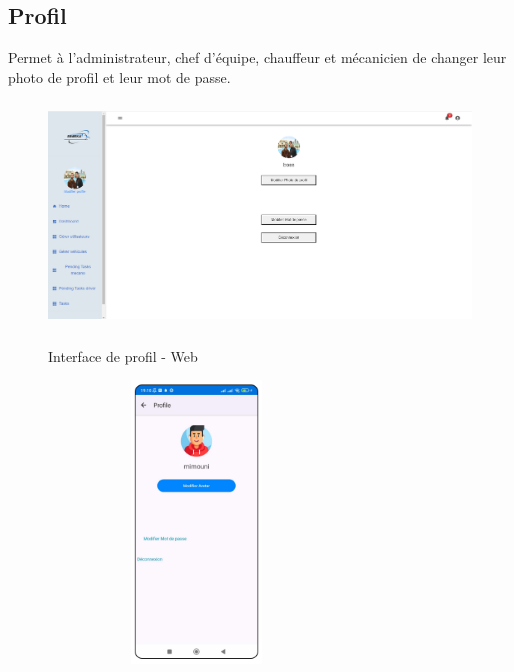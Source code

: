 \vspace{1.2cm}

\subsection{ Profil}

Permet à l'administrateur, chef d'équipe, chauffeur et mécanicien de changer leur photo de profil et leur mot de passe.

\begin{figure}[h!]
  \centering
  \begin{minipage}[t]{0.59\textwidth}
    \centering
    \includegraphics[width=1\textwidth, height=6cm]{chap3.images/modifier profil (web).png}
    \caption{Interface de profil  - Web}
  \end{minipage}
  \hfill
  \begin{minipage}[t]{0.39\textwidth}
    \centering
    \includegraphics[width=0.7\textwidth, height=7.5cm]{chap3.images/modifier profil mobile.png}
    \caption{}
  \end{minipage}
\end{figure}

